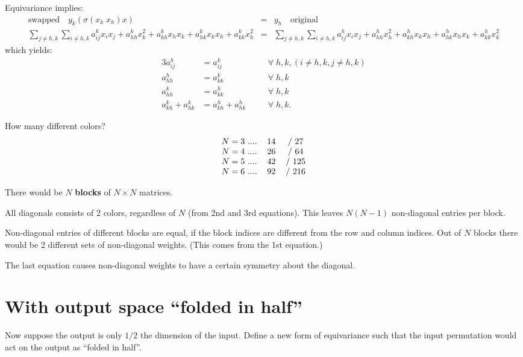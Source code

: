 Equivariance implies:
\begin{eqnarray}
\boxed{\mbox{swapped}} \quad y_k ( \sigma(x_k \; x_h) x) &=& y_h \quad \boxed{\mbox{original}} \\
\sum_{j \neq h,k} \sum_{i \neq h,k} a_{ij}^k x_i x_j + a_{hh}^k x_k^2 + a_{kh}^k x_h x_k + a_{hk}^k x_k x_h + a_{kk}^k x_h^2 &=& \sum_{j \neq h,k} \sum_{i \neq h,k} a_{ij}^h x_i x_j + a_{hh}^h x_h^2 + a_{kh}^h x_k x_h + a_{hk}^h x_h x_k + a_{kk}^h x_k^2 \nonumber
\end{eqnarray}
which yields:
\begin{alignat}{3}
a_{ij}^h &= a_{ij}^k && \forall \; h,k, (i \neq h,k, j \neq h,k) \nonumber \\
a_{hh}^h &= a_{kk}^k && \forall \; h,k \nonumber \\
a_{hh}^k &= a_{kk}^h && \forall \; h,k \nonumber \\
a_{kh}^k + a_{hk}^k &= a_{kh}^h + a_{hk}^h \quad && \forall \; h,k .
\end{alignat}

How many different colors?
\begin{equation}
\begin{tabular}{c c c}
$N = 3$ .... & 14 & / 27 \\
$N = 4$ .... & 26 & / 64 \\
$N = 5$ .... & 42 & / 125 \\
$N = 6$ .... & 92 & / 216 
\end{tabular}
\end{equation}

There would be $N$ \textbf{blocks} of $N \times N$ matrices.

All diagonals consists of 2 colors, regardless of $N$ (from 2nd and 3rd equations).  This leaves $N (N - 1)$ non-diagonal entries per block.

Non-diagonal entries of different blocks are equal, if the block indices are different from the row and column indices.  Out of $N$ blocks there would be 2 different sets of non-diagonal weights.  (This comes from the 1st equation.)

The last equation causes non-diagonal weights to have a certain symmetry about the diagonal.  

\section{With output space ``folded in half''}

Now suppose the output is only $1/2$ the dimension of the input.  Define a new form of equivariance such that the input permutation would act on the output as ``folded in half''. 

